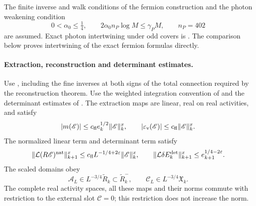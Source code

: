 The finite inverse and walk conditions of the fermion construction
and the photon weakening condition
\[
 0<\alpha_0\le\tfrac14,\qquad
 2\alpha_0 n_P\log M\le\gamma_PM,\qquad n_P=402
\]
are assumed. Exact photon intertwining under odd covers is
\cite[(46)]{MaxwellBlockManuscript}. The comparison below proves
intertwining of the exact fermion formulas directly.

\paragraph{Extraction, reconstruction and determinant estimates.}
Use \cite[Theorems A--B and Appendix B]{NormalizedContraction},
including the fine inverses at both signs of the total connection
required by the reconstruction theorem.
Use the weighted integration convention of
\cite[Theorem B and Proposition 5.1]{FermionBlockManuscript}
and the determinant estimates of
\cite[Propositions 6.1--6.2]{FermionBlockManuscript}.
The extraction maps are linear, real on real activities, and satisfy
\[
 |m(\mathscr E)|\le c_{\rm fl}e_k^{1/2}\|\mathscr E\|_k^x,\qquad
 |\varepsilon_{\rm v}(\mathscr E)|\le c_{\rm fl}\|\mathscr E\|_k^x .
\]
The normalized linear term and determinant term satisfy
\[
 \|\mathcal L(R\mathscr E)^{\rm nat}\|_{k+1}^x
      \le c_{\rm fl}L^{-1/4+2\varepsilon}\|\mathscr E\|_k^x,
 \qquad
 \|\mathcal L\delta E_k^{\rm det}\|_{k+1}^x
      \le e_{k+1}^{1/4-2\varepsilon}.
\]
The scaled domains obey
\[
 \mathscr A_L\in L^{-3/4}\widetilde R_k\subset\widetilde R_k^-,
 \qquad \mathscr C_L\in L^{-3/4}\mathfrak X_k.
\]
The complete real activity spaces, all these maps and their norms
commute with restriction to the external slot \(\mathscr C=0\);
this restriction does not increase the norm.

